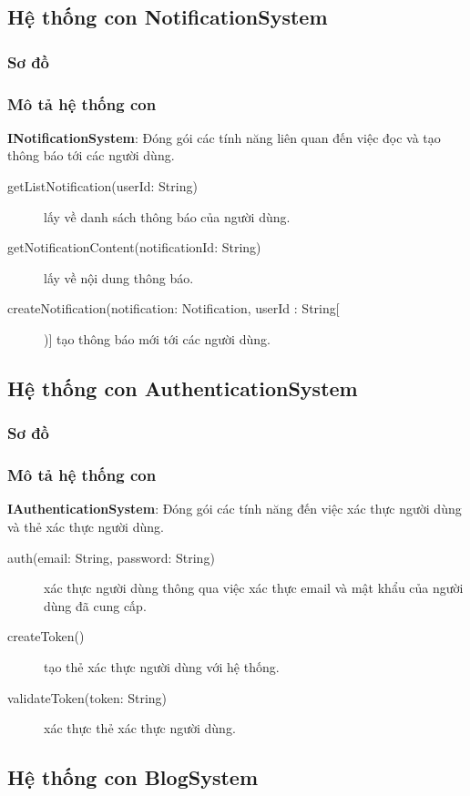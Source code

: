 \documentclass[./../main_file.tex]{subfiles}
\begin{document}
	\subsection{Hệ thống con NotificationSystem}
		\subsubsection{Sơ đồ}
		\subsubsection{Mô tả hệ thống con}
		\textbf{INotificationSystem}: Đóng gói các tính năng liên quan đến việc đọc và tạo thông báo tới các người dùng.
		\begin{description}
			\item[getListNotification(userId: String)] lấy về danh sách thông báo của người dùng.
			\item[getNotificationContent(notificationId: String)] lấy về nội dung thông báo.
			\item[createNotification(notification: Notification, userId : String[])] tạo thông báo mới tới các người dùng.
		\end{description}
		
		
	\subsection{Hệ thống con AuthenticationSystem}
		\subsubsection{Sơ đồ}
		\subsubsection{Mô tả hệ thống con}
		\textbf{IAuthenticationSystem}: Đóng gói các tính năng đến việc xác thực người dùng và thẻ xác thực người dùng.
		\begin{description}
		\item[auth(email: String, password: String)] xác thực người dùng thông qua việc xác thực email và mật khẩu của người dùng đã cung cấp.
		\item[createToken()] tạo thẻ xác thực người dùng với hệ thống.
		\item[validateToken(token: String)] xác thực thẻ xác thực người dùng.
		\end{description}	
		
	\subsection{Hệ thống con BlogSystem}
\end{document}
